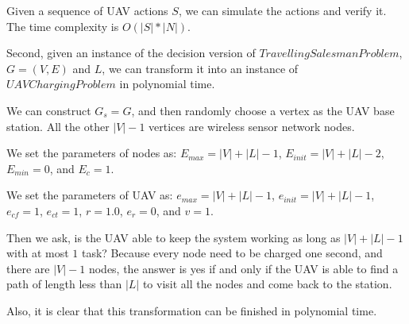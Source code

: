 Given a sequence of UAV actions $S$, we can simulate the actions and verify it. The time complexity is $O(|S| * |N|)$.

Second, given an instance of the decision version of $Travelling Salesman Problem$, $G = (V, E)$ and $L$, we can transform it into an instance of $UAV Charging Problem$ in polynomial time.

We can construct $G_s = G$, and then randomly choose a vertex as the UAV base station. All the other $|V|-1$ vertices are wireless sensor network nodes.

We set the parameters of nodes as: $E_{max} = |V| + |L| - 1$, $E_{init} = |V| + |L| - 2$, $E_{min} = 0$, and $E_{c} = 1$.

We set the parameters of UAV as: $e_{max} = |V| + |L| - 1$, $e_{init} = |V| + |L| - 1$, $e_{cf} = 1$, $e_{ct} = 1$, $r = 1.0$, $e_r = 0$, and $v = 1$.

Then we ask, is the UAV able to keep the system working as long as $|V| + |L| - 1$ with at most $1$ task? Because every node need to be charged one second, and there are $|V|-1$ nodes, the answer is yes if and only if the UAV is able to find a path of length less than $|L|$ to visit all the nodes and come back to the station.

Also, it is clear that this transformation can be finished in polynomial time.
